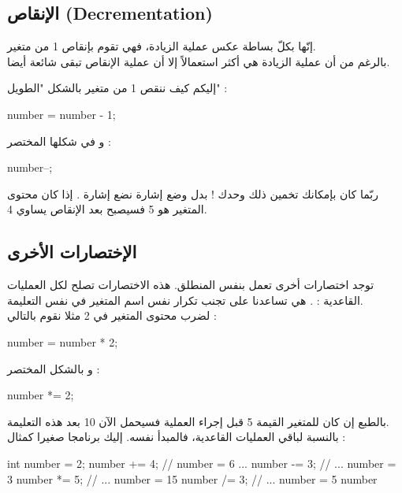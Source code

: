 \subsection{الإنقاص (\textenglish{Decrementation})}

إنّها بكلّ بساطة عكس عملية الزيادة، فهي تقوم بإنقاص 1 من متغير.\\
بالرغم من أن عملية الزيادة هي أكثر استعمالاً إلا أن عملية الإنقاص تبقى شائعة أيضا.

إليكم كيف ننقص 1 من متغير بالشكل "الطويل" :

\begin{Csource}
  number = number - 1;
\end{Csource}

و في شكلها المختصر :

\begin{Csource}
  number--;
\end{Csource}

ربّما كان بإمكانك تخمين ذلك وحدك ! بدل وضع إشارة
\InlineCode{++}
نضع إشارة
\InlineCode{{-}{-}}.
إذا كان محتوى المتغير هو 5 فسيصبح بعد الإنقاص يساوي 4.

\subsection{الإختصارات الأخرى}

توجد اختصارات أخرى تعمل بنفس المنطلق. هذه الاختصارات تصلح لكل العمليات القاعدية :
\InlineCode{+}
\InlineCode{-}
\InlineCode{*}
\InlineCode{/}
\InlineCode{\%}.
هي تساعدنا على تجنب تكرار نفس اسم المتغير في نفس التعليمة.\\
لضرب محتوى المتغير في 2 مثلا نقوم بالتالي :

\begin{Csource}
  number = number * 2;
\end{Csource}

و بالشكل المختصر :

\begin{Csource}
  number *= 2;
\end{Csource}

بالطبع إن كان للمتغير القيمة 5 قبل إجراء العملية فسيحمل الآن 10 بعد هذه التعليمة.\\
بالنسبة لباقي العمليات القاعدية، فالمبدأ نفسه. إليك برنامجا صغيرا كمثال :

\begin{Csource}
int number = 2;
number += 4; // number = 6 ...
number -= 3; // ... number = 3
number *= 5; // ... number = 15
number /= 3; // ... number = 5
number %
\end{Csource}

